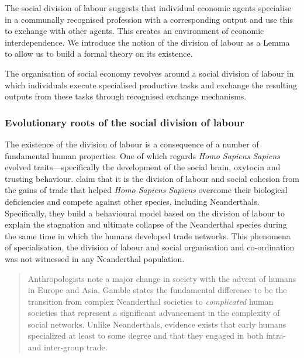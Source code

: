 The social division of labour suggests that individual economic agents specialise in a communally recognised profession with a corresponding output and use this to exchange with other agents. This creates an environment of economic interdependence. We introduce the notion of the division of labour as a Lemma to allow us to build a formal theory on its existence.

\begin{lemma} \label{SDoL}
The organisation of social economy revolves around a social division of labour in which individuals execute specialised productive tasks and exchange the resulting outputs from these tasks through recognised exchange mechanisms.
\end{lemma}

\subsubsection{Evolutionary roots of the social division of labour}

The existence of the division of labour is a consequence of a number of fundamental human properties. One of which regards \emph{Homo Sapiens Sapiens} evolved traits---specifically the development of the social brain, oxytocin and trusting behaviour. \citet{Horan2005} claim that it is the division of labour and social cohesion from the gains of trade that helped \emph{Homo Sapiens Sapiens} overcome their biological deficiencies and compete against other species, including Neanderthals. Specifically, they build a behavioural model based on the division of labour to explain the stagnation and ultimate collapse of the Neanderthal species during the same time in which the humans developed trade networks. This phenomena of specialisation, the division of labour and social organisation and co-ordination was not witnessed in any Neanderthal population.

\begin{quote}
Anthropologists note a major change in society with the advent of humans in Europe and Asia. Gamble states the fundamental difference to be the transition from complex Neanderthal societies to \emph{complicated} human societies that represent a significant advancement in the complexity of social networks. Unlike Neanderthals, evidence exists that early humans specialized at least to some degree and that they engaged in both intra- and inter-group trade.

\begin{flushright}
\citet[p.~5]{Horan2005}
\end{flushright}
\end{quote}

